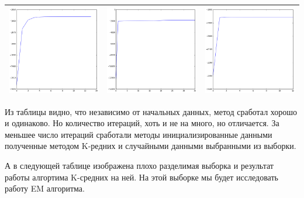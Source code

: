 \documentclass[12pt, a4paper]{article}
\begin{document}
\begin{center}
\begin{tabular}{ c c c }
				\includegraphics[width=5cm]{4par_kminit_MLE.png} &
				\includegraphics[width=5cm]{4par_rdinit_MLE.png} &
				\includegraphics[width=5cm]{4par_rdinitx_MLE.png} \\

				\hline
			\end{tabular}
			\end{center}

			Из таблицы видно, что независимо от начальных данных, метод сработал хорошо и одинаково. Но количество итераций, хоть и не на много, но отличается. За меньшее число итераций сработали методы инициализированные данными полученные методом K-редних и случайными данными выбранными из выборки.

			\newpage
			А в следующей таблице изображена плохо разделимая выборка и результат работы алгортима K-средних на ней. На этой выборке мы будет исследовать работу EM алгоритма.
\end{document}
